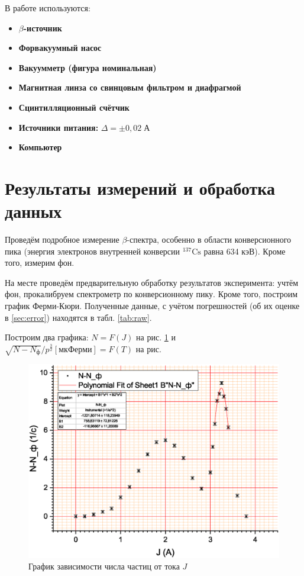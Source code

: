 \documentclass[a4paper]{article}
\newcommand{\isotope}[2]{$ ^{#2}\mathrm{#1} $}
\newcommand{\btt}{$\beta $}
\newcommand{\Equip}[3]{
	
	\item{\bf #1:} $\Delta = \pm #2\; #3$}
\newcommand{\equip}[1]{
	
	\item{\bf #1}}
\begin{document}
	\newpage
	В работе используются:
	\begin{itemize}
		\equip{\btt-источник}
		\equip{Форвакуумный насос}
		\equip{Вакуумметр (фигура номинальная)}
		\equip{Магнитная линза со свинцовым фильтром и диафрагмой}
		\equip{Сцинтилляционный счётчик}
		\Equip{Источники питания}{0,02}{А}
		\equip{Компьютер}
	\end{itemize}
	
	\section{Результаты измерений и обработка данных}
	
	Проведём подробное измерение \btt-спектра, особенно в области конверсионного пика (энергия электронов внутренней конверсии	\isotope{Cs}{137} равна 634 кэВ).	Кроме того, измерим фон.
	
	На месте проведём предварительную обработку результатов эксперимента: учтём фон, прокалибруем спектрометр по конверсионному пику. Кроме того, построим график Ферми-Кюри.
	Полученные данные, с учётом погрешностей (об их оценке в \ref{sec:error}) находятся в табл. \ref{tab:raw}. 
	
	Построим два графика: $ N = F(J) $ на рис. \ref{fig:graph1} и $ \sqrt{N - N_ф}/p^{\frac{3}{2}}\left[мкФерми\right] = F(T) $	на рис.
	
	\begin{figure}[]
		\centering
		\includegraphics[width=0.9\linewidth]{Graph1}
		\caption{График зависимости числа частиц от тока $J$}
		\label{fig:graph1}
	\end{figure}
	
\end{document}
